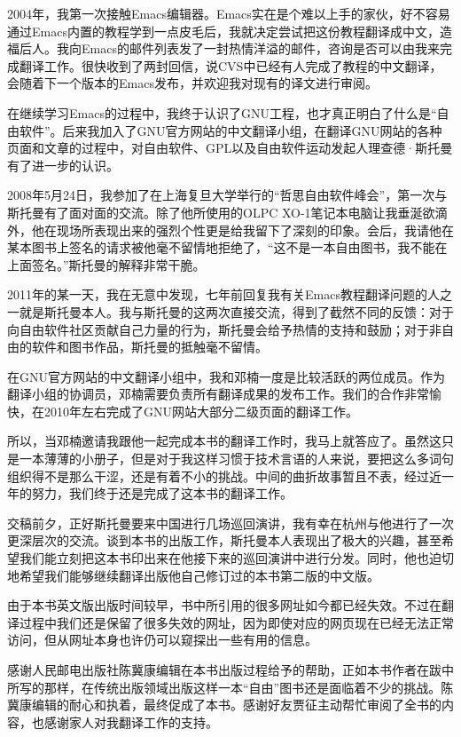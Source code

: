 2004年，我第一次接触Emacs编辑器。Emacs实在是个难以上手的家伙，好不容易通过Emacs内置的教程学到一点皮毛后，我就决定尝试把这份教程翻译成中文，造福后人。我向Emacs的邮件列表发了一封热情洋溢的邮件，咨询是否可以由我来完成翻译工作。很快收到了两封回信，说CVS中已经有人完成了教程的中文翻译，会随着下一个版本的Emacs发布，并欢迎我对现有的译文进行审阅。

在继续学习Emacs的过程中，我终于认识了GNU工程，也才真正明白了什么是``自由软件''。后来我加入了GNU官方网站的中文翻译小组，在翻译GNU网站的各种页面和文章的过程中，对自由软件、GPL以及自由软件运动发起人理查德·斯托曼有了进一步的认识。

2008年5月24日，我参加了在上海复旦大学举行的``哲思自由软件峰会''，第一次与斯托曼有了面对面的交流。除了他所使用的OLPC XO-1笔记本电脑让我垂涎欲滴外，他在现场所表现出来的强烈个性更是给我留下了深刻的印象。会后，我请他在某本图书上签名的请求被他毫不留情地拒绝了，``这不是一本自由图书，我不能在上面签名。''斯托曼的解释非常干脆。

2011年的某一天，我在无意中发现，七年前回复我有关Emacs教程翻译问题的人之一就是斯托曼本人。我与斯托曼的这两次直接交流，得到了截然不同的反馈：对于向自由软件社区贡献自己力量的行为，斯托曼会给予热情的支持和鼓励；对于非自由的软件和图书作品，斯托曼的抵触毫不留情。

在GNU官方网站的中文翻译小组中，我和邓楠一度是比较活跃的两位成员。作为翻译小组的协调员，邓楠需要负责所有翻译成果的发布工作。我们的合作非常愉快，在2010年左右完成了GNU网站大部分二级页面的翻译工作。

所以，当邓楠邀请我跟他一起完成本书的翻译工作时，我马上就答应了。虽然这只是一本薄薄的小册子，但是对于我这样习惯于技术言语的人来说，要把这么多词句组织得不是那么干涩，还是有着不小的挑战。中间的曲折故事暂且不表，经过近一年的努力，我们终于还是完成了这本书的翻译工作。

交稿前夕，正好斯托曼要来中国进行几场巡回演讲，我有幸在杭州与他进行了一次更深层次的交流。谈到本书的出版工作，斯托曼本人表现出了极大的兴趣，甚至希望我们能立刻把这本书印出来在他接下来的巡回演讲中进行分发。同时，他也迫切地希望我们能够继续翻译出版他自己修订过的本书第二版的中文版。

由于本书英文版出版时间较早，书中所引用的很多网址如今都已经失效。不过在翻译过程中我们还是保留了很多失效的网址，因为即使对应的网页现在已经无法正常访问，但从网址本身也许仍可以窥探出一些有用的信息。

感谢人民邮电出版社陈冀康编辑在本书出版过程给予的帮助，正如本书作者在跋中所写的那样，在传统出版领域出版这样一本``自由''图书还是面临着不少的挑战。陈冀康编辑的耐心和执着，最终促成了本书。感谢好友贾征主动帮忙审阅了全书的内容，也感谢家人对我翻译工作的支持。

